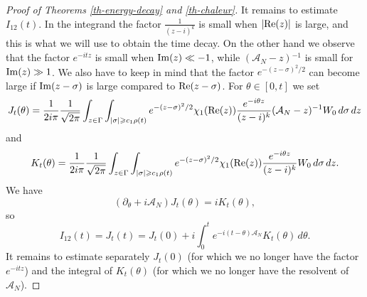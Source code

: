 \documentclass[10pt, a4paper,reqno]{amsart}
\theoremstyle{plain}
\theoremstyle{definition}
\theoremstyle{remark}
\begin{document}
\begin{proof}[Proof of Theorems \ref{th-energy-decay} and \ref{th-chaleur}]
{\noindent {\bf $\bullet$}\quad } It remains to estimate $I_{12}(t)$. In the integrand the factor $\frac 1 {(z-i)^k}$ is small when ${\left\vert {{\mathop{\rm{Re}}\nolimits}(z)}\right\vert}$ is large, and this is what we will use to obtain the time decay. On the other hand we observe that the factor $e^{-itz}$ is small when ${\mathop{\rm{Im}}\nolimits}(z) \ll -1$, while $({{{\mathcal A}}_N}-z){^{-1}}$ is small for ${\mathop{\rm{Im}}\nolimits}(z) \gg 1$. We also have to keep in mind that the factor $e^{-(z-\sigma)^2/2}$ can become large if ${\mathop{\rm{Im}}\nolimits}(z-\sigma)$ is large compared to ${\mathop{\rm{Re}}\nolimits}(z-\sigma)$.
For ${\theta} \in [0,t]$ we set 
\[
J_t({\theta}) =  \frac 1 {2i\pi} \frac 1 {\sqrt {2\pi}} \int_{z \in {\Gamma}} \int_{{\left\vert {\sigma}\right\vert} {\geqslant} c_1 \rho(t)} e^{-(z-\sigma)^2/2} {\chi}_1({\mathop{\rm{Re}}\nolimits}(z)) \frac {e^{-i{\theta} z}}{(z -i)^k} ({{{\mathcal A}}_N}-z){^{-1}} W_0 \, d\sigma \, dz
\]
and 
\[
K_t({\theta}) =  \frac 1 {2i\pi} \frac 1 {\sqrt {2\pi}} \int_{z \in {\Gamma}} \int_{{\left\vert {\sigma}\right\vert} {\geqslant} c_1 \rho(t)} e^{-(z-\sigma)^2/2} {\chi}_1({\mathop{\rm{Re}}\nolimits}(z)) \frac {e^{-i{\theta} z}}{(z -i)^k} W_0 \, d\sigma \, dz.
\]
We have 
\[
(\partial_{\theta} + i {{{\mathcal A}}_N}) J_t({\theta}) = i K_t({\theta}),
\]
so 
\begin{equation} \label{dec-I12}
I_{12}(t) = J_t(t) = J_t(0) + i \int_0^t e^{-i(t-{\theta}){{{\mathcal A}}_N}} K_t({\theta}) \, d{\theta}.
\end{equation}
It remains to estimate separately $J_t(0)$ (for which we no longer have the factor $e^{-itz}$) and the integral of $K_t({\theta})$ (for which we no longer have the resolvent of ${{{\mathcal A}}_N}$).


\end{proof}
\end{document}
